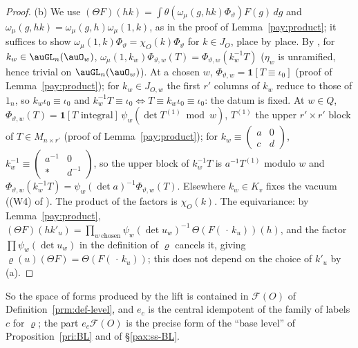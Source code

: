 \documentclass[10pt]{amsart}
\theoremstyle{definition}
\theoremstyle{remark}
\providecommand{\plone}{\mathbf 1}
\begin{document}
\begin{proof}
(b) We use $(\Theta F)(hk)=\int\theta(\omega_\mu(g,hk)\Phi_\vartheta)F(g)\,dg$ and $\omega_\mu(g,hk)=
\omega_\mu(g,h)\omega_\mu(1,k)$, as in the proof of Lemma~\ref{pay:product}; it suffices to show
$\omega_\mu(1,k)\Phi_\vartheta=\chi_O(k)\Phi_\vartheta$ for $k\in J_O$, place by place. By
{\cite[(1)]{P54}}, for $k_w\in\auGL_n(\auO_w)$, $\omega_\mu(1,k_w)\Phi_{\vartheta,w}(T)=\Phi_{\vartheta,w}
(k_w^{-1}T)$ ($\eta_w$ is unramified, hence trivial on $\auGL_n(\auO_w)$). At a chosen $w$,
$\Phi_{\vartheta,w}=\plone[T\equiv\iota_0]$ (proof of Lemma~\ref{pay:product}); for $k_w\in J_{O,w}$ the
first $r'$ columns of $k_w$ reduce to those of $1_n$, so $k_w\iota_0\equiv\iota_0$ and $k_w^{-1}T\equiv
\iota_0\iff T\equiv k_w\iota_0\equiv\iota_0$: the datum is fixed. At $w\in Q$, $\Phi_{\vartheta,w}(T)=
\plone[T\text{ integral}]\,\psi_w(\det T^{(1)}\bmod w)$, $T^{(1)}$ the upper $r'\times r'$ block of
$T\in M_{n\times r'}$ (proof of Lemma~\ref{pay:product}); for $k_w\equiv\left(\begin{smallmatrix}a&0\\
c&d\end{smallmatrix}\right)$, $k_w^{-1}\equiv\left(\begin{smallmatrix}a^{-1}&0\\ *&d^{-1}\end{smallmatrix}
\right)$, so the upper block of $k_w^{-1}T$ is $a^{-1}T^{(1)}$ modulo $w$ and $\Phi_{\vartheta,w}(k_w^{-1}T)=
\psi_w(\det a)^{-1}\Phi_{\vartheta,w}(T)$. Elsewhere $k_w\in K_v$ fixes the vacuum ((W4) of
{\cite[Lemma~5.2]{P49}}). The product of the factors is $\chi_O(k)$. The equivariance: by Lemma~\ref{pay:product},
$(\Theta F)(hk'_u)=\prod_{w\ \mathrm{chosen}}\psi_w(\det u_w)^{-1}\,\Theta(F(\,\cdot\,k_u))(h)$, and the
factor $\prod\psi_w(\det u_w)$ in the definition of $\varrho$ cancels it, giving
$\varrho(u)(\Theta F)=\Theta(F(\,\cdot\,k_u))$; this does not depend on the choice of $k'_u$ by (a).
\end{proof}

So the space of forms produced by the lift is contained in $\mathcal F(O)$ of
Definition~\ref{prm:def-level}, and $e_c$ is the central idempotent of the family of labels $c$ for
$\varrho$; the part $e_c\mathcal F(O)$ is the precise form of the ``base level'' of Proposition~\ref{pri:BL} and of
\S\ref{pax:ss-BL}.
\end{document}
